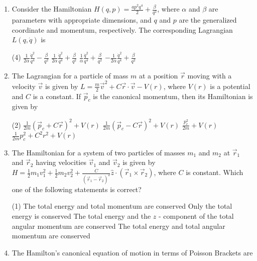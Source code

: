 \begin{enumerate}
	{}
	\item  Consider the Hamiltonian $H(q, p)=\frac{a p^{2} q^{4}}{2}+\frac{\beta}{q^{2}}$, where $\alpha$ and $\beta$ are parameters with appropriate dimensions, and $q$ and $p$ are the generalized coordinate and momentum, respectively. The corresponding Lagrangian $L(q, \dot{q})$ is
{}
	 \begin{tasks}(4)
		\task[\textbf{a.}] $\frac{1}{2 \alpha} \frac{\dot{q}^{2}}{q^{4}}-\frac{\beta}{q^{2}}$
		\task[\textbf{b.}]$\frac{1}{2 \alpha} \frac{\dot{q}^{2}}{q^{4}}+\frac{\beta}{q^{2}}$
		\task[\textbf{c.}]$\frac{1}{\alpha} \frac{\dot{q}^{2}}{q^{4}}+\frac{\beta}{q^{2}}$
		\task[\textbf{d.}] $-\frac{1}{2 \alpha} \frac{\dot{q}^{2}}{q^{4}}+\frac{\beta}{q^{2}}$
	\end{tasks}
	\item  The Lagrangian for a particle of mass $m$ at a position $\vec{r}$ moving with a velocity $\vec{v}$ is given by $L=\frac{m}{2} \vec{v}^{2}+C \vec{r} \cdot \vec{v}-V(r)$, where $V(r)$ is a potential and $C$ is a constant. If $\vec{p}_{c}$ is the canonical momentum, then its Hamiltonian is given by
{}
	 \begin{tasks}(2)
		\task[\textbf{a.}]$\frac{1}{2 m}\left(\vec{p}_{c}+C \vec{r}\right)^{2}+V(r)$
		\task[\textbf{b.}]$\frac{1}{2 m}\left(\vec{p}_{c}-C \vec{r}\right)^{2}+V(r)$
		\task[\textbf{c.}]$\frac{p_{c}^{2}}{2 m}+V(r)$
		\task[\textbf{d.}]  $\frac{1}{2 m} p_{c}^{2}+C^{2} r^{2}+V(r)$
	\end{tasks}
	\item  The Hamiltonian for a system of two particles of masses $m_{1}$ and $m_{2}$ at $\vec{r}_{1}$ and $\vec{r}_{2}$ having velocities $\vec{v}_{1}$ and $\vec{v}_{2}$ is given by $H=\frac{1}{2} m_{1} v_{1}^{2}+\frac{1}{2} m_{2} v_{2}^{2}+\frac{C}{\left(\vec{r}_{1}-\vec{r}_{2}\right)^{2}} \hat{z} \cdot\left(\vec{r}_{1} \times \vec{r}_{2}\right)$, where $C$ is constant. Which one of the following statements is correct?
	{}
	 \begin{tasks}(1)
		\task[\textbf{a.}] The total energy and total momentum are conserved
		\task[\textbf{b.}]Only the total energy is conserved
		\task[\textbf{c.}]The total energy and the $z$ - component of the total angular momentum are conserved
		\task[\textbf{d.}]  The total energy and total angular momentum are conserved
	\end{tasks}
	\item  The Hamilton's canonical equation of motion in terms of Poisson Brackets are

\end{enumerate}
